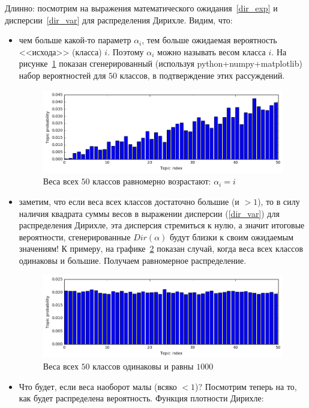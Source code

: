 \begin{solution}
\begin{itemize}
	Длинно: посмотрим на выражения математического ожидания~\ref{dir_exp} и дисперсии~\ref{dir_var} для распределения Дирихле. Видим, что:
	\begin{itemize}
		\item чем больше какой-то параметр $\alpha_i$, тем больше ожидаемая вероятность <<исхода>> (класса) $i$. Поэтому $\alpha_i$ можно называть весом класса $i$. На рисунке~\ref{fig:dir_inc_w} показан сгенерированный (используя python+numpy+matplotlib) набор вероятностей для $50$ классов, в подтверждение этих рассуждений.
	\begin{figure}[ht!]
	\centering
	\includegraphics[scale=0.65]{3.png}
	\caption{Веса всех $50$ классов равномерно возрастают: $\alpha_i = i$}
	\label{fig:dir_inc_w}
	\end{figure}
		\item заметим, что если веса всех классов достаточно большие (и $>1$), то в силу наличия квадрата суммы весов в выражении дисперсии (\ref{dir_var}) для распределения Дирихле, эта дисперсия стремиться к нулю, а значит итоговые вероятности, сгенерированные $Dir(\alpha)$ будут близки к своим ожидаемым значениям! К примеру, на графике~\ref{fig:eq_w_dir} показан случай, когда веса всех классов одинаковы и большие. Получаем равномерное распределение.
	\begin{figure}[ht!]
	\centering
	\includegraphics[scale=0.65]{1.png}
	\caption{Веса всех $50$ классов одинаковы и равны $1000$}
	\label{fig:eq_w_dir}
	\end{figure}
		\item Что будет, если веса наоборот малы (всяко $< 1$)? Посмотрим теперь на то, как будет распределена вероятность. Функция плотности Дирихле: 

\end{itemize}
\end{itemize}
\end{solution}
